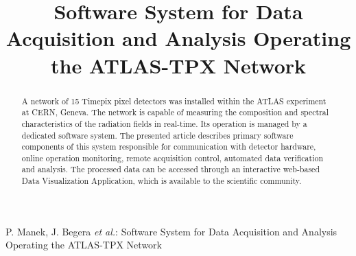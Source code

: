 \documentclass[conference,a4paper]{IEEEtran}
\begin{document}
\title{Software System for Data Acquisition and Analysis Operating the ATLAS-TPX Network}

\author{
}

\markboth{}%
{P. Manek, J. Begera \MakeLowercase{\textit{et al.}}: Software System for Data Acquisition and Analysis Operating the ATLAS-TPX Network}

\maketitle


\begin{abstract}
A network of 15 Timepix pixel detectors was installed within the ATLAS experiment at CERN, Geneva. The network is capable of measuring the composition and spectral characteristics of the radiation fields in real-time. Its operation is managed by a dedicated software system. The presented article describes primary software components of this system responsible for communication with detector hardware, online operation monitoring, remote acquisition control, automated data verification and analysis. The processed data can be accessed through an interactive web-based Data Visualization Application, which is available to the scientific community.
\end{abstract}



















\end{document}
